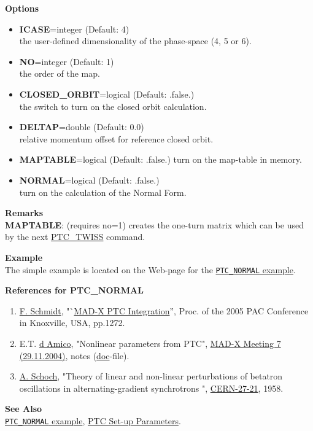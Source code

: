 {\bf Options} \\
\begin{itemize}
  \item {\bf ICASE}=integer (Default: 4)\\
    the user-defined dimensionality of the phase-space (4, 5 or 6).

  \item {\bf NO}=integer (Default: 1)\\ 
    the order of the map. 
    
  \item {\bf CLOSED\_ORBIT}=logical (Default: .false.) \\
    the switch to turn on the closed orbit calculation. 

  \item {\bf DELTAP}=double (Default: 0.0) \\
    relative momentum offset for reference closed orbit.

  \item {\bf MAPTABLE}=logical (Default: .false.) 
    turn on the map-table in memory.

  \item{\bf NORMAL}=logical (Default: .false.)\\
    turn on the calculation of the Normal Form.
\end{itemize}


{\bf Remarks} \\ 
\textbf{MAPTABLE}: (requires no=1) creates the one-turn matrix which can
be used by the next \href{../ptc_twiss/ptc_twiss.html}{PTC\_TWISS} command. 
  
{\bf Example}\\
The simple example is located on the Web-page for the
\href{http://cern.ch/frs/mad-X_examples/ptc_normal}{\texttt{PTC\_NORMAL}
  example}. 

{\bf References for PTC\_NORMAL} \\
\begin{enumerate}
   \item \href{F._Schmidt}{F. Schmidt},
     "`\href{http://cern.ch/madx/doc/MPPE012.pdf}{MAD-X PTC Integration}'',
     Proc. of the 2005 PAC Conference in Knoxville, USA, pp.1272. 
   \item E.T. \href{d Amico}{d Amico}, "Nonlinear parameters from PTC",
     \href{http://cern.ch/frs/MAD-X_minutes/Meeting-7}{MAD-X Meeting 7
       (29.11.2004)}, notes
     (\href{http://cern.ch/frs/MAD-X_minutes/Meeting-7/Nonlinear_parameters_from_PTC.doc}{doc}-file). 
   \item \href{A._Schoch}{A. Schoch}, "Theory of linear and non-linear
     perturbations of betatron oscillations in alternating-gradient
     synchrotrons ",
     \href{http://cern.ch/madx/doc/yellow-report-1957.pdf}{CERN-27-21}, 1958. 
\end{enumerate}

{\bf See Also}\\
\href{http://cern.ch/frs/mad-X_examples/ptc_normal}{\texttt{PTC\_NORMAL} example}, 
\href{../ptc_general/ptc_general.html}{PTC Set-up Parameters}. 




